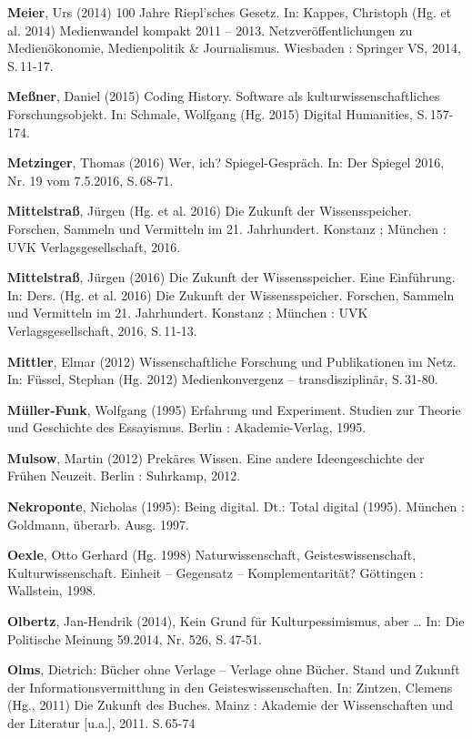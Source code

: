 \documentclass[a4paper,
fontsize=11pt,
oneside,
numbers=noperiodatend,
parskip=half-,
bibliography=totoc,
final
]{scrartcl}
\begin{document}
\textbf{Meier}, Urs (2014) 100 Jahre Riepl'sches Gesetz. In: Kappes,
Christoph (Hg. et al. 2014) Medienwandel kompakt 2011 -- 2013.
Netzveröffentlichungen zu Medienökonomie, Medienpolitik \& Journalismus.
Wiesbaden : Springer VS, 2014, S.\,11-17.

\textbf{Meßner}, Daniel (2015) Coding History. Software als
kulturwissenschaftliches Forschungsobjekt. In: Schmale, Wolfgang (Hg.
2015) Digital Humanities, S.\,157-174.

\textbf{Metzinger}, Thomas (2016) Wer, ich? Spiegel-Gespräch. In: Der
Spiegel 2016, Nr. 19 vom 7.5.2016, S.\,68-71.

\textbf{Mittelstraß}, Jürgen (Hg. et al. 2016) Die Zukunft der
Wissensspeicher. Forschen, Sammeln und Vermitteln im 21. Jahrhundert.
Konstanz ; München : UVK Verlagsgesellschaft, 2016.

\textbf{Mittelstraß}, Jürgen (2016) Die Zukunft der Wissensspeicher.
Eine Einführung. In: Ders. (Hg. et al. 2016) Die Zukunft der
Wissensspeicher. Forschen, Sammeln und Vermitteln im 21. Jahrhundert.
Konstanz ; München : UVK Verlagsgesellschaft, 2016, S.\,11-13.

\textbf{Mittler}, Elmar (2012) Wissenschaftliche Forschung und
Publikationen im Netz. In: Füssel, Stephan (Hg. 2012) Medienkonvergenz
-- transdisziplinär, S.\,31-80.

\textbf{Müller-Funk}, Wolfgang (1995) Erfahrung und Experiment. Studien
zur Theorie und Geschichte des Essayismus. Berlin : Akademie-Verlag,
1995.

\textbf{Mulsow}, Martin (2012) Prekäres Wissen. Eine andere
Ideengeschichte der Frühen Neuzeit. Berlin : Suhrkamp, 2012.

\textbf{Nekroponte}, Nicholas (1995): Being digital. Dt.: Total digital
(1995). München : Goldmann, überarb. Ausg. 1997.

\textbf{Oexle}, Otto Gerhard (Hg. 1998) Naturwissenschaft,
Geisteswissenschaft, Kulturwissenschaft. Einheit -- Gegensatz --
Komplementarität? Göttingen : Wallstein, 1998.

\textbf{Olbertz}, Jan-Hendrik (2014), Kein Grund für Kulturpessimismus,
aber \ldots{} In: Die Politische Meinung 59.2014, Nr. 526, S.\,47-51.

\textbf{Olms}, Dietrich: Bücher ohne Verlage -- Verlage ohne Bücher.
Stand und Zukunft der Informationsvermittlung in den
Geisteswissenschaften. In: Zintzen, Clemens (Hg., 2011) Die Zukunft des
Buches. Mainz : Akademie der Wissenschaften und der Literatur
{[}u.a.{]}, 2011. S.\,65-74
\end{document}
